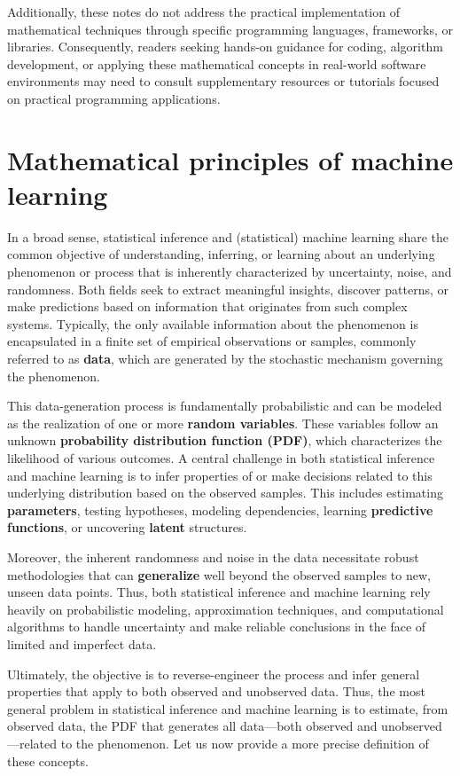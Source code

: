 \documentclass{report}
\begin{document}
Additionally, these notes do not address the practical implementation of mathematical techniques through specific programming languages, frameworks, or libraries. Consequently, readers seeking hands-on guidance for coding, algorithm development, or applying these mathematical concepts in real-world software environments may need to consult supplementary resources or tutorials focused on practical programming applications.

\chapter{Mathematical principles of machine learning}
In a broad sense, statistical inference and (statistical) machine learning share the common objective of understanding, inferring, or learning about an underlying phenomenon or process that is inherently characterized by uncertainty, noise, and randomness. Both fields seek to extract meaningful insights, discover patterns, or make predictions based on information that originates from such complex systems. Typically, the only available information about the phenomenon is encapsulated in a finite set of empirical observations or samples, commonly referred to as \textbf{data}, which are generated by the stochastic mechanism governing the phenomenon.

This data-generation process is fundamentally probabilistic and can be modeled as the realization of one or more \textbf{random variables}. These variables follow an unknown \textbf{probability distribution function (PDF)}, which characterizes the likelihood of various outcomes. A central challenge in both statistical inference and machine learning is to infer properties of or make decisions related to this underlying distribution based on the observed samples. This includes estimating \textbf{parameters}, testing hypotheses, modeling dependencies, learning \textbf{predictive functions}, or uncovering \textbf{latent} structures.

Moreover, the inherent randomness and noise in the data necessitate robust methodologies that can \textbf{generalize} well beyond the observed samples to new, unseen data points. Thus, both statistical inference and machine learning rely heavily on probabilistic modeling, approximation techniques, and computational algorithms to handle uncertainty and make reliable conclusions in the face of limited and imperfect data.

Ultimately, the objective is to reverse-engineer the process and infer general properties that apply to both observed and unobserved data. Thus, the most general problem in statistical inference and machine learning is to estimate, from observed data, the PDF that generates all data—both observed and unobserved—related to the phenomenon. Let us now provide a more precise definition of these concepts.
\end{document}
